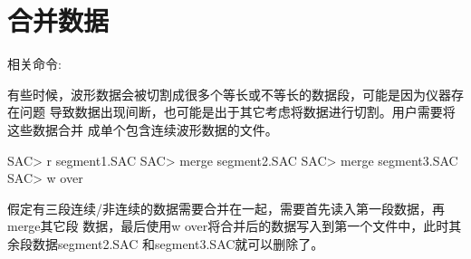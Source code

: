 \section{合并数据}
相关命令: 

有些时候，波形数据会被切割成很多个等长或不等长的数据段，可能是因为仪器存在问题
导致数据出现间断，也可能是出于其它考虑将数据进行切割。用户需要将这些数据合并
成单个包含连续波形数据的文件。

\begin{SACCode}
SAC> r segment1.SAC
SAC> merge segment2.SAC
SAC> merge segment3.SAC
SAC> w over
\end{SACCode}

假定有三段连续/非连续的数据需要合并在一起，需要首先读入第一段数据，再merge其它段
数据，最后使用w over将合并后的数据写入到第一个文件中，此时其余段数据segment2.SAC
和segment3.SAC就可以删除了。
